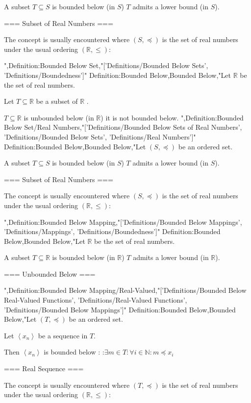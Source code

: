 A subset $T \subseteq S$ is bounded below (in $S$)  $T$ admits a lower bound (in $S$).


=== Subset of Real Numbers ===

The concept is usually encountered where $\left( S, \preceq \right)$ is the set of real numbers under the usual ordering $\left( \mathbb R, \le \right)$:

",Definition:Bounded Below Set,"['Definitions/Bounded Below Sets', 'Definitions/Boundedness']"
Definition:Bounded Below,Bounded Below,"Let $\mathbb R$ be the set of real numbers.

Let $T \subseteq \mathbb R$ be a subset of $\mathbb R$ .


$T \subseteq \mathbb R$ is unbounded below (in $\mathbb R$)  it is not bounded below.
",Definition:Bounded Below Set/Real Numbers,"['Definitions/Bounded Below Sets of Real Numbers', 'Definitions/Bounded Below Sets', 'Definitions/Real Numbers']"
Definition:Bounded Below,Bounded Below,"Let $\left( S, \preceq \right)$ be an ordered set.


A subset $T \subseteq S$ is bounded below (in $S$)  $T$ admits a lower bound (in $S$).


=== Subset of Real Numbers ===

The concept is usually encountered where $\left( S, \preceq \right)$ is the set of real numbers under the usual ordering $\left( \mathbb R, \le \right)$:


",Definition:Bounded Below Mapping,"['Definitions/Bounded Below Mappings', 'Definitions/Mappings', 'Definitions/Boundedness']"
Definition:Bounded Below,Bounded Below,"Let $\mathbb R$ be the set of real numbers.

A subset $T \subseteq \mathbb R$ is bounded below (in $\mathbb R$)  $T$ admits a lower bound (in $\mathbb R$).


=== Unbounded Below ===

",Definition:Bounded Below Mapping/Real-Valued,"['Definitions/Bounded Below Real-Valued Functions', 'Definitions/Real-Valued Functions', 'Definitions/Bounded Below Mappings']"
Definition:Bounded Below,Bounded Below,"Let $\left( T, \preceq \right)$ be an ordered set.

Let $\left\langle x_n \right\rangle$ be a sequence in $T$.


Then $\left\langle x_n \right\rangle$ is bounded below :
:$\exists m \in T: \forall i \in \mathbb N: m \preceq x_i$


=== Real Sequence ===

The concept is usually encountered where $\left( T, \preceq \right)$ is the set of real numbers under the usual ordering $\left( \mathbb R, \le \right)$:

